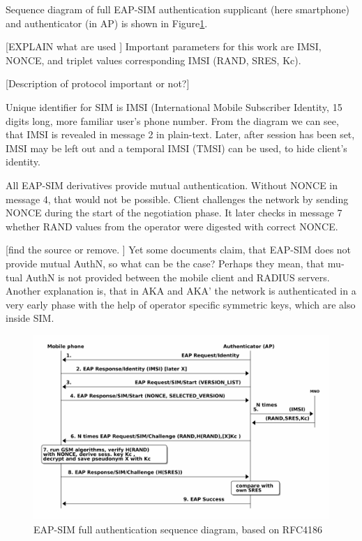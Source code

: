 \documentclass[12pt,a4paper,english]{tutthesis}
\begin{document}
\begin{otherlanguage}{english}
Sequence diagram of full EAP-SIM authentication supplicant (here
smartphone) and authenticator (in AP) is shown in
Figure\ref{fig:eap-sim-full}. 

[EXPLAIN what are used ]
Important parameters for this work are IMSI, NONCE, and triplet values
corresponding IMSI (RAND, SRES, Kc).

[Description of protocol important or not?]

Unique identifier for SIM is IMSI (International Mobile Subscriber
Identity, 15 digits long, more familiar user's phone number.
From the diagram we can see, that IMSI is
revealed in message 2 in plain-text. Later, after session has been
set, IMSI may be left out and a temporal IMSI (TMSI) can be used,
to hide client's identity.

All EAP-SIM derivatives provide mutual authentication. Without NONCE
in message 4, that would not be possible. 
 Client challenges the network by
sending NONCE during the start of the negotiation phase. It later checks in
message 7 whether RAND values from the operator were digested with correct NONCE.

[find the source or remove. ] 
Yet some documents claim, that EAP-SIM does not provide mutual AuthN, so what
can be the case? Perhaps they mean, that mutual AuthN is not provided between
the mobile client  and RADIUS servers. Another explanation is, that in AKA
and AKA' the network is authenticated in a very early phase with the
help of operator specific symmetric keys, which are also inside SIM.





\begin{figure}[htb]
\centering
\includegraphics[width=.9\linewidth]{eap-sim-full.png}
\caption{\label{fig:eap-sim-full}EAP-SIM full authentication sequence diagram, based on RFC4186}
\end{figure}

\end{otherlanguage}
\end{document}
